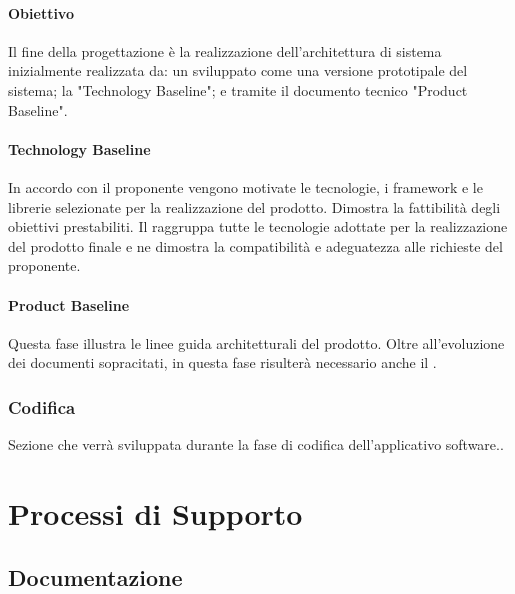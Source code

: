 \paragraph{Obiettivo}
Il fine della progettazione è la realizzazione dell'architettura di sistema inizialmente realizzata da: un \docNamePoC{}\glo{}  sviluppato come una versione prototipale del sistema; la  "Technology Baseline"; e tramite il documento tecnico  "Product Baseline".

\paragraph{Technology Baseline}
In accordo con il proponente vengono motivate le tecnologie, i framework\glo{} e le librerie selezionate per la realizzazione del prodotto. Dimostra la fattibilità degli obiettivi prestabiliti.
Il \docNamePoC{} raggruppa tutte le tecnologie adottate per la realizzazione del prodotto finale e ne dimostra la compatibilità e adeguatezza alle richieste del proponente.

\paragraph{Product Baseline}
Questa fase illustra le linee guida architetturali del prodotto. Oltre all’evoluzione dei documenti sopracitati, in questa fase risulterà necessario anche il \docNameMU{}.

\subsubsection{Codifica}
Sezione che verrà sviluppata durante la fase di codifica dell'applicativo software..

\section{Processi di Supporto}
\subsection{Documentazione}
